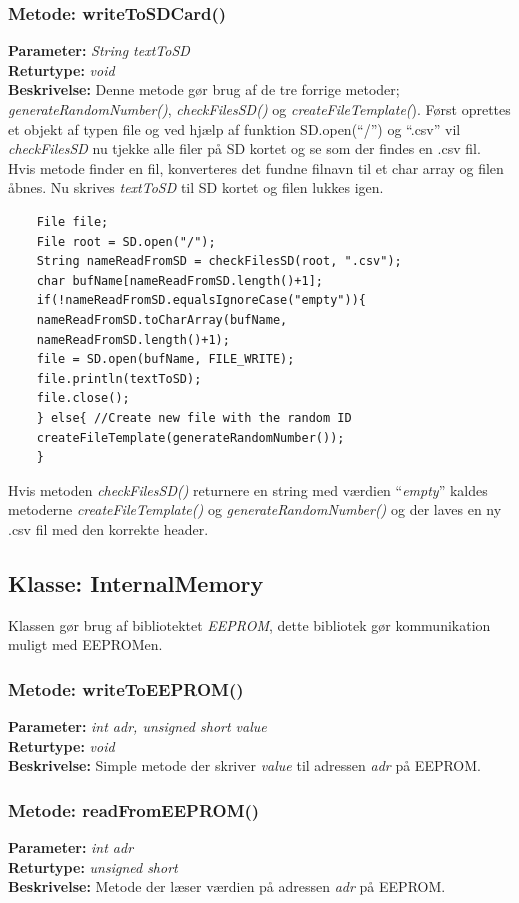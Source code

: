 \subsubsection{Metode: writeToSDCard()}
\textbf{Parameter: } \textit{String textToSD}
\\ \textbf{Returtype: } \textit{void}
\\ \textbf{Beskrivelse: }  Denne metode gør brug af de tre forrige metoder; \textit{generateRandomNumber()}, \textit{checkFilesSD()} og \textit{createFileTemplate(}). Først oprettes et objekt af typen file og ved hjælp af funktion SD.open(“/”) og “.csv” vil \textit{checkFilesSD} nu tjekke alle filer på SD kortet og se som der findes en .csv fil. Hvis metode finder en fil, konverteres det fundne filnavn til et char array og filen åbnes. Nu skrives \textit{textToSD} til SD kortet og filen lukkes igen. 
\begin{lstlisting}
	File file;
	File root = SD.open("/");
	String nameReadFromSD = checkFilesSD(root, ".csv");
	char bufName[nameReadFromSD.length()+1]; 
	if(!nameReadFromSD.equalsIgnoreCase("empty")){ 
	nameReadFromSD.toCharArray(bufName,
	nameReadFromSD.length()+1); 
	file = SD.open(bufName, FILE_WRITE);
	file.println(textToSD);
	file.close();
	} else{ //Create new file with the random ID
	createFileTemplate(generateRandomNumber());
	}
\end{lstlisting}
Hvis metoden \textit{checkFilesSD()} returnere en string med værdien “\textit{empty}” kaldes metoderne \textit{createFileTemplate()} og \textit{generateRandomNumber()} og der laves en ny .csv fil med den korrekte header. 

\subsection{Klasse: InternalMemory}
Klassen gør brug af bibliotektet \textit{EEPROM}, dette bibliotek gør kommunikation muligt med EEPROMen. 

\subsubsection{Metode: writeToEEPROM()}
\textbf{Parameter: } \textit{int adr, unsigned short value}
\\ \textbf{Returtype: } \textit{void}
\\ \textbf{Beskrivelse: }  Simple metode der skriver \textit{value} til adressen \textit{adr} på EEPROM.

\subsubsection{Metode: readFromEEPROM()}
\textbf{Parameter: } \textit{int adr}
\\ \textbf{Returtype: } \textit{unsigned short}
\\ \textbf{Beskrivelse: }  Metode der læser værdien på adressen \textit{adr} på EEPROM. 


